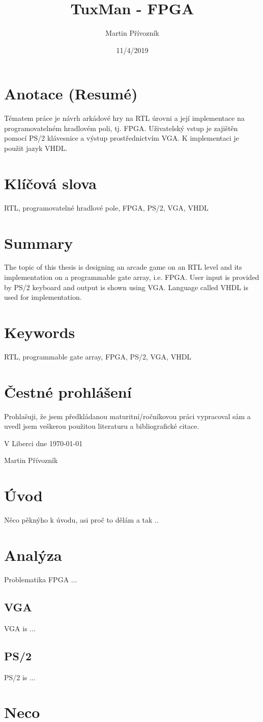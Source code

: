 \documentclass{article}
\title{TuxMan - FPGA}
\date{11/4/2019}
\author{Martin Přívozník}
\newcommand*\wildcard[2][5cm]{\vspace*{2cm}\parbox{#1}{\hrulefill\par#2}}
\begin{document}
  
  \newpage

 \section*{Anotace (Resumé)}
 Tématem práce je návrh arkádové hry na RTL úrovni a její implementace na programovatelném hradlovém poli, tj. FPGA. Uživatelský vstup je zajištěn pomocí PS/2 klávesnice a výstup prostřednictvím VGA. K implementaci je použit jazyk VHDL.

\section*{Klíčová slova}
RTL, programovatelné hradlové pole, FPGA, PS/2, VGA, VHDL

 \section*{Summary}
 The topic of this thesis is designing an arcade game on an RTL level and its implementation on a programmable gate array, i.e. FPGA. User input is provided by PS/2 keyboard and output is shown using VGA. Language called VHDL is used for implementation.

\section*{Keywords}
RTL, programmable gate array, FPGA, PS/2, VGA, VHDL

 \newpage
\vspace*{\fill}

 \section*{Čestné prohlášení}
 Prohlašuji, že jsem předkládanou maturitní/ročníkovou práci vypracoval sám a uvedl jsem veškerou použitou literaturu a bibliografické citace.

\vspace{ 2cm}
  V Liberci dne \today
  \hspace{2cm}
  \wildcard{Martin Přívozník}

\newpage
\tableofcontents

\newpage
{}

 \section*{Úvod}
 Něco pěknýho k úvodu, asi proč to dělám a tak ..

\section{Analýza}
Problematika FPGA ...
\subsection{VGA}
VGA is ...
\subsection{PS/2}
PS/2 is ...
\section{Neco}
\end{document}
